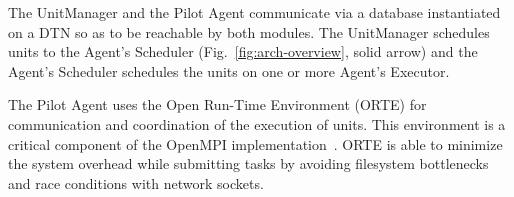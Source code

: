The UnitManager and the Pilot Agent communicate via a database instantiated on a
DTN so as to be reachable by both modules. The UnitManager schedules units to
the Agent's Scheduler (Fig.~\ref{fig:arch-overview}, solid arrow) and the
Agent's Scheduler schedules the units on one or more Agent's Executor.

The Pilot Agent uses the Open Run-Time Environment (ORTE) for communication and
coordination of the execution of units. This environment is a critical
component of the OpenMPI implementation~\cite{castain05:_open_rte}.
ORTE is able to minimize the system overhead while submitting tasks by
avoiding filesystem bottlenecks and race conditions with network sockets.